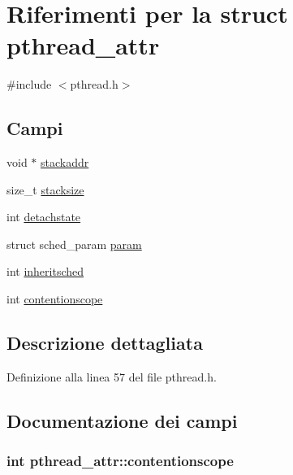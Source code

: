\hypertarget{structpthread__attr}{\section{Riferimenti per la struct pthread\+\_\+attr}
\label{structpthread__attr}
}


{\ttfamily \#include $<$pthread.\+h$>$}

\subsection*{Campi}
\begin{DoxyCompactItemize}
\item 
void $\ast$ \hyperlink{structpthread__attr_a004b9c2b7c75177f4de0262277f48333}{stackaddr}
\item 
size\+\_\+t \hyperlink{structpthread__attr_a8b8eaabf2bc9b4cec33d7764bbb115d9}{stacksize}
\item 
int \hyperlink{structpthread__attr_a2ac0f3f9d4513024bbafc7db17c25a46}{detachstate}
\item 
struct sched\+\_\+param \hyperlink{structpthread__attr_a371c70c9e51a2444860395f7045bbd3e}{param}
\item 
int \hyperlink{structpthread__attr_ab6bef83bc858c0ffb3c8d0b461ba4396}{inheritsched}
\item 
int \hyperlink{structpthread__attr_a1d5ca4923f6814d754208080896a360a}{contentionscope}
\end{DoxyCompactItemize}


\subsection{Descrizione dettagliata}


Definizione alla linea 57 del file pthread.\+h.



\subsection{Documentazione dei campi}
\hypertarget{structpthread__attr_a1d5ca4923f6814d754208080896a360a}{
\subsubsection[{contentionscope}]{\setlength{\rightskip}{0pt plus 5cm}int pthread\+\_\+attr\+::contentionscope}}\label{structpthread__attr_a1d5ca4923f6814d754208080896a360a}


